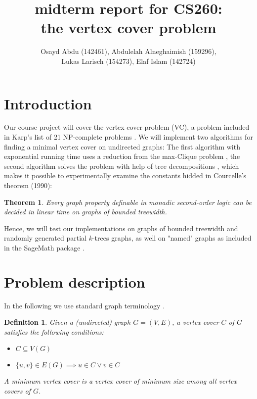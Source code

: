 \documentclass[11pt,a4paper]{article}
\title{midterm report for CS260: \\ \normalsize the vertex cover problem}
\author{Osayd Abdu (142461), Abdulelah Alneghaimish (159296), \\ Lukas Larisch (154273), Elaf Islam (142724)}
\date{}
\newtheorem*{definition}{Definition}
\newtheorem*{theorem}{Theorem}
\begin{document}
\maketitle

\section{Introduction}

Our course project will cover the vertex cover problem (VC), a problem included in Karp's list of 21 NP-complete  problems \cite{karp, wiki}. We will implement two algorithms for finding a minimal vertex cover on undirected graphs: The first algorithm with exponential running time uses a reduction from the max-Clique problem \cite{Patric}, the second algorithm solves the problem with help of tree decompositions \cite{survey, graphminor, arnborg}, which makes it possible to experimentally examine the constants hidded in Courcelle's theorem (1990):

\begin{theorem}
Every graph property definable in monadic second-order logic can be decided in linear time on graphs of bounded treewidth.
\end{theorem}

Hence, we will test our implementations on graphs of bounded treewidth and randomly generated partial $k$-trees graphs, as well on "named" graphs as included in the SageMath package \cite{sage}.

\section{Problem description}

In the following we use standard graph terminology \cite{Diestel}.

\begin{definition}

Given a (undirected) graph $G = (V, E)$, a \emph{vertex cover} $C$ of $G$ satisfies the following conditions:

\begin{itemize}
\item $C \subseteq V(G)$ 
\item $\{u, v\} \in E(G) \implies u \in C \lor v \in C$ 
\end{itemize}

A \emph{minimum vertex cover} is a vertex cover of minimum size among all vertex covers of $G$.

\end{definition}
\end{document}
